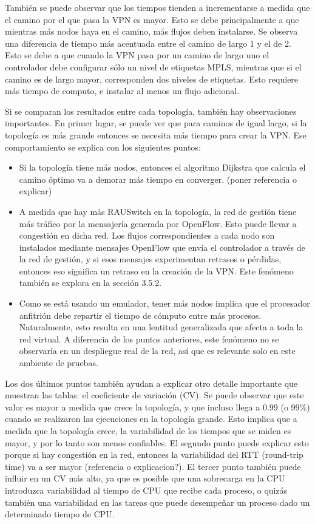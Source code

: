 También se puede observar que los tiempos tienden a incrementarse a medida que el camino por el que pasa la VPN es mayor. Esto se debe principalmente a que mientras más nodos haya en el camino, más flujos deben instalarse. Se observa una diferencia de tiempo más acentuada entre el camino de largo 1 y el de 2. Esto se debe a que cuando la VPN pasa por un camino de largo uno el controlador debe configurar sólo un nivel de etiquetas MPLS, mientras que si el camino es de largo mayor, corresponden dos niveles de etiquetas. Esto requiere más tiempo de computo, e instalar al menos un flujo adicional.

Si se comparan los resultados entre cada topología, también hay observaciones importantes. En primer lugar, se puede ver que para caminos de igual largo, si la topología es más grande entonces se necesita más tiempo para crear la VPN. Ese comportamiento se explica con los siguientes puntos:
\begin{itemize}
	\item Si la topología tiene más nodos, entonces el algoritmo Dijkstra que calcula el camino óptimo va a demorar más tiempo en converger. (poner referencia o explicar)
	\item A medida que hay más RAUSwitch en la topología, la red de gestión tiene más tráfico por la mensajería generada por OpenFlow. Esto puede llevar a congestión en dicha red. Los flujos correspondientes a cada nodo son instalados mediante mensajes OpenFlow que envía el controlador a través de la red de gestión, y si esos mensajes experimentan retrasos o pérdidas, entonces eso significa un retraso en la creación de la VPN. Este fenómeno también se explora en la sección 3.5.2.
	\item Como se está usando un emulador, tener más nodos implica que el procesador anfitrión debe repartir el tiempo de cómputo entre más procesos. Naturalmente, esto resulta en una lentitud generalizada que afecta a toda la red virtual. A diferencia de los puntos anteriores, este fenómeno no se observaría en un despliegue real de la red, así que es relevante solo en este ambiente de pruebas.
\end{itemize}
Los dos últimos puntos también ayudan a explicar otro detalle importante que muestran las tablas: el coeficiente de variación (CV). Se puede observar que este valor es mayor a medida que crece la topología, y que incluso llega a 0.99 (o 99\%) cuando se realizaron las ejecuciones en la topología grande. Esto implica que a medida que la topología crece, la variabilidad de los tiempos que se miden es mayor, y por lo tanto son menos confiables.
El segundo punto puede explicar esto porque si hay congestión en la red, entonces la variabilidad del RTT (round-trip time) va a ser mayor (referencia o explicacion?). El tercer punto también puede influir en un CV más alto, ya que es posible que una sobrecarga en la CPU introduzca variabilidad al tiempo de CPU que recibe cada proceso, o quizás también una variabilidad en las tareas que puede desempeñar un proceso dado un determinado tiempo de CPU. \\

